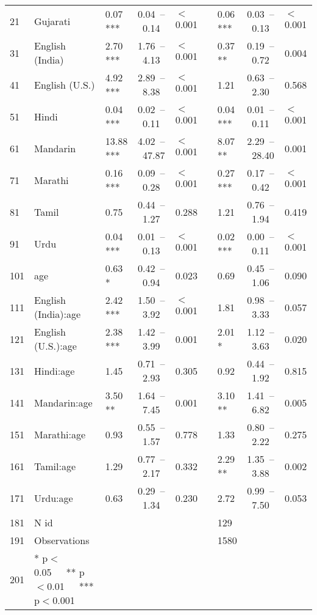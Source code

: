 \begin{table}[ht]
\begin{tabular}{}
  21 & Gujarati & 0.07 *** & 0.04 – 0.14 & $<$0.001 &  & 0.06 *** & 0.03 – 0.13 & $<$0.001 \\ 
  31 & English (India) & 2.70 *** & 1.76 – 4.13 & $<$0.001 &  & 0.37 ** & 0.19 – 0.72 & 0.004 \\ 
  41 & English (U.S.) & 4.92 *** & 2.89 – 8.38 & $<$0.001 &  & 1.21 & 0.63 – 2.30 & 0.568 \\ 
  51 & Hindi & 0.04 *** & 0.02 – 0.11 & $<$0.001 &  & 0.04 *** & 0.01 – 0.11 & $<$0.001 \\ 
  61 & Mandarin & 13.88 *** & 4.02 – 47.87 & $<$0.001 &  & 8.07 ** & 2.29 – 28.40 & 0.001 \\ 
  71 & Marathi & 0.16 *** & 0.09 – 0.28 & $<$0.001 &  & 0.27 *** & 0.17 – 0.42 & $<$0.001 \\ 
  81 & Tamil & 0.75 & 0.44 – 1.27 & 0.288 &  & 1.21 & 0.76 – 1.94 & 0.419 \\ 
  91 & Urdu & 0.04 *** & 0.01 – 0.13 & $<$0.001 &  & 0.02 *** & 0.00 – 0.11 & $<$0.001 \\ 
  101 & age & 0.63 * & 0.42 – 0.94 & 0.023 &  & 0.69 & 0.45 – 1.06 & 0.090 \\ 
  111 & English (India):age & 2.42 *** & 1.50 – 3.92 & $<$0.001 &  & 1.81 & 0.98 – 3.33 & 0.057 \\ 
  121 & English (U.S.):age & 2.38 *** & 1.42 – 3.99 & 0.001 &  & 2.01 * & 1.12 – 3.63 & 0.020 \\ 
  131 & Hindi:age & 1.45 & 0.71 – 2.93 & 0.305 &  & 0.92 & 0.44 – 1.92 & 0.815 \\ 
  141 & Mandarin:age & 3.50 ** & 1.64 – 7.45 & 0.001 &  & 3.10 ** & 1.41 – 6.82 & 0.005 \\ 
  151 & Marathi:age & 0.93 & 0.55 – 1.57 & 0.778 &  & 1.33 & 0.80 – 2.22 & 0.275 \\ 
  161 & Tamil:age & 1.29 & 0.77 – 2.17 & 0.332 &  & 2.29 ** & 1.35 – 3.88 & 0.002 \\ 
  171 & Urdu:age & 0.63 & 0.29 – 1.34 & 0.230 &  & 2.72 & 0.99 – 7.50 & 0.053 \\ 
  181 & N id &  &  &  &  & 129 &  &  \\ 
  191 & Observations &  &  &  &  & 1580 &  &  \\ 
  201 & * p$<$0.05   ** p$<$0.01   *** p$<$0.001 &  &  &  &  &  &  &  \\ 
   \hline
\end{tabular}
\end{table}
